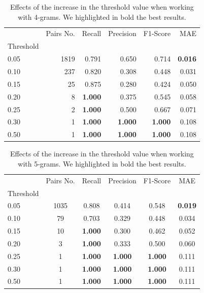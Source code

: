 \documentclass[runningheads]{llncs}
\begin{document}
\begin{table}
  \caption{Effects of the increase in the threshold value when working with 4-grams. We highlighted in bold the best results.}
  \label{tab:experiments:threshold_k4}
  \centering
  \begin{tabular}{lrrrrr}
    \toprule
    {} &  Pairs No. &  Recall &  Precision &  F1-Score &    MAE \\
    Threshold &            &         &            &           &        \\
    \midrule
    0.05      &       1819 &   0.791 &      0.650 &     0.714 &  \textbf{0.016} \\
    0.10      &        237 &   0.820 &      0.308 &     0.448 &  0.031 \\
    0.15      &         25 &   0.875 &      0.280 &     0.424 &  0.050 \\
    0.20      &          8 &   \textbf{1.000} &      0.375 &     0.545 &  0.058 \\
    0.25      &          2 &   \textbf{1.000} &      0.500 &     0.667 &  0.071 \\
    0.30      &          1 &   \textbf{1.000} &      \textbf{1.000} &     \textbf{1.000} &  0.108 \\
    0.50      &          1 &   \textbf{1.000} &      \textbf{1.000} &     \textbf{1.000} &  0.108 \\
    \bottomrule
    \end{tabular}
\end{table}

\begin{table}
  \caption{Effects of the increase in the threshold value when working with 5-grams. We highlighted in bold the best results.}
  \label{tab:experiments:threshold_k5}
  \centering
  \begin{tabular}{lccccc}
    \toprule
    {} &  Pairs No. &  Recall &  Precision &  F1-Score &    MAE \\
    Threshold &            &         &            &           &        \\
    \midrule
    0.05      &       1035 &   0.808 &      0.414 &     0.548 &  \textbf{0.019} \\
    0.10      &         79 &   0.703 &      0.329 &     0.448 &  0.034 \\
    0.15      &         10 &   \textbf{1.000} &      0.300 &     0.462 &  0.052 \\
    0.20      &          3 &   \textbf{1.000} &      0.333 &     0.500 &  0.060 \\
    0.25      &          1 &   \textbf{1.000} &      \textbf{1.000} &     \textbf{1.000} &  0.111 \\
    0.30      &          1 &   \textbf{1.000} &      \textbf{1.000} &     \textbf{1.000} &  0.111 \\
    0.50      &          1 &   \textbf{1.000} &      \textbf{1.000} &     \textbf{1.000} &  0.111 \\
    \bottomrule
    \end{tabular}
\end{table}
\end{document}
